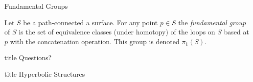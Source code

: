 \documentclass{beamer}
\begin{document}
	\begin{frame}{Fundamental Groups}
		\begin{definition}
			Let $S$ be a path-connected a surface. For any point $p\in S$ the \emph{fundamental group} of $S$ is the set of equivalence classes (under homotopy) of the loops on $S$ based at $p$ with the concatenation operation. This group is denoted $\pi_1(S)$.
		\end{definition}
	\end{frame}
	\begin{comment}
		\begin{center}
			\begin{tikzpicture}[scale=.75]
				\draw[thin] plot[smooth,tension=1,name path=C] coordinates {(-1,0) (0,.5) (1,0)};
				\begin{scope}
					\draw[clip] plot[smooth,tension=1,name path=A] coordinates {(-1,0) (-0.7,1) (0,2)};
					\fill[blue] plot[smooth,tension=1,name path=B] coordinates {(1,0) (0.7,1) (0,2)} -- plot[smooth,tension=1,name path=A] coordinates {(-1,0) (-0.7,1) (0,2)};
				\end{scope}
				\draw[very thin] (-.7,1) arc (180:360:.7 and .2);
				\draw[very thin, dashed] (-.7,1) arc (180:0:.7 and .2);
			\end{tikzpicture}
		\end{center}
	\end{comment}
	
	\begin{frame}
		\begin{beamercolorbox}[sep=8pt,center,shadow=true,rounded=true]{title}
			Questions?\par%
		\end{beamercolorbox}
		\begin{beamercolorbox}[sep=8pt,center,shadow=true,rounded=true]{title}
			Hyperbolic Structures\par%
		\end{beamercolorbox}
	\end{frame}
	
\end{document}
